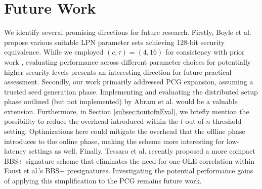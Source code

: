 \section{Future Work}
We identify several promising directions for future research. Firstly, Boyle et al. \cite{boyle2020efficient} propose various suitable LPN parameter sets achieving 128-bit security equivalence. While we employed $(c,\tau)=(4,16)$ for consistency with prior work \cite{abram2022low}, evaluating performance across different parameter choices for potentially higher security levels presents an interesting direction for future practical assessment. Secondly, our work primarily addressed PCG expansion, assuming a trusted seed generation phase. Implementing and evaluating the distributed setup phase outlined (but not implemented) by Abram et al. \cite{abram2022low} would be a valuable extension. Furthermore, in Section \ref{subsec:toutofnEval}, we briefly mention the possibility to reduce the overhead introduced within the $t$-out-of-$n$ threshold setting. Optimizations here could mitigate the overhead that the offline phase introduces to the online phase, making the scheme more interesting for low-latency settings as well. Finally, Tessaro et al. \cite{tessaro2023revisiting} recently proposed a more compact BBS+ signature scheme that eliminates the need for one OLE correlation within Faust et al.'s BBS+ presignatures. Investigating the potential performance gains of applying this simplification to the PCG remains future work.